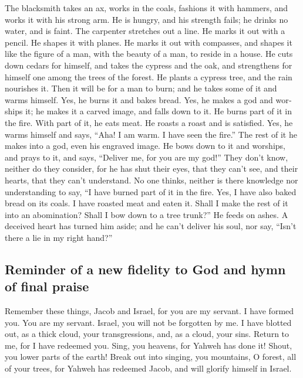 \begin{paracol}{2}
\begin{otherlanguage}{english}
 The blacksmith takes an ax, works in the coals, fashions
it with hammers, and works it with his strong arm. He is hungry, and his
strength fails; he drinks no water, and is faint.  The
carpenter stretches out a line. He marks it out with a pencil. He shapes
it with planes. He marks it out with compasses, and shapes it like the
figure of a man, with the beauty of a man, to reside in a house.
 He cuts down cedars for himself, and takes the cypress
and the oak, and strengthens for himself one among the trees of the
forest. He plants a cypress tree, and the rain nourishes it.
 Then it will be for a man to burn; and he takes some of
it and warms himself. Yes, he burns it and bakes bread. Yes, he makes a
god and worships it; he makes it a carved image, and falls down to it.
 He burns part of it in the fire. With part of it, he
eats meat. He roasts a roast and is satisfied. Yes, he warms himself and
says, ``Aha! I am warm. I have seen the fire.''  The rest
of it he makes into a god, even his engraved image. He bows down to it
and worships, and prays to it, and says, ``Deliver me, for you are my
god!''  They don't know, neither do they consider, for he
has shut their eyes, that they can't see, and their hearts, that they
can't understand.  No one thinks, neither is there
knowledge nor understanding to say, ``I have burned part of it in the
fire. Yes, I have also baked bread on its coals. I have roasted meat and
eaten it. Shall I make the rest of it into an abomination? Shall I bow
down to a tree trunk?''  He feeds on ashes. A deceived
heart has turned him aside; and he can't deliver his soul, nor say,
``Isn't there a lie in my right hand?''

\hypertarget{reminder-of-a-new-fidelity-to-god-and-hymn-of-final-praise}{%
\subsection{Reminder of a new fidelity to God and hymn of final
praise}\label{reminder-of-a-new-fidelity-to-god-and-hymn-of-final-praise}}

 Remember these things, Jacob and Israel, for you are my
servant. I have formed you. You are my servant. Israel, you will not be
forgotten by me.  I have blotted out, as a thick cloud,
your transgressions, and, as a cloud, your sins. Return to me, for I
have redeemed you.  Sing, you heavens, for Yahweh has
done it! Shout, you lower parts of the earth! Break out into singing,
you mountains, O forest, all of your trees, for Yahweh has redeemed
Jacob, and will glorify himself in Israel.


\end{otherlanguage}
\end{paracol}
